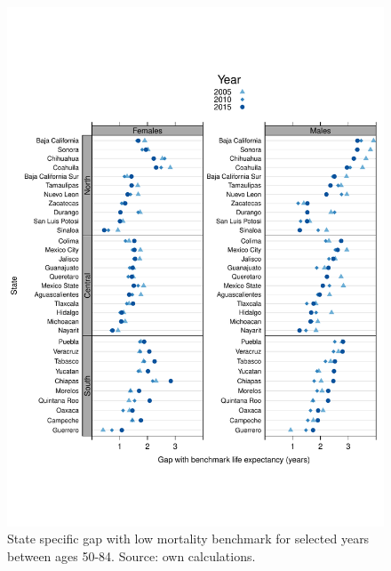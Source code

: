 \documentclass[11.5pt]{article}
\begin{document}
{\begin{figure}
\centering
\caption{State specific gap with low mortality benchmark for selected years between ages 50-84. Source: own calculations.}
\begin{center}
\includegraphics[scale=.8]{Figures/Distance_oa.pdf}
\end{center}
\end{figure}






}
\end{document}
